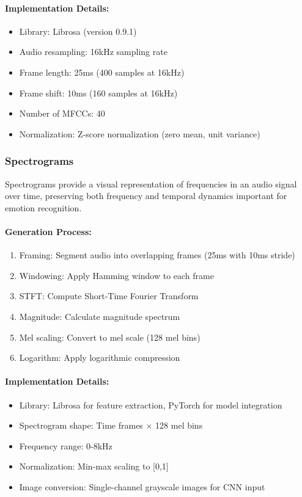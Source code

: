 \documentclass[12pt]{article}
\begin{document}
\paragraph{Implementation Details:}
\begin{itemize}
    \item Library: Librosa (version 0.9.1)
    \item Audio resampling: 16kHz sampling rate
    \item Frame length: 25ms (400 samples at 16kHz)
    \item Frame shift: 10ms (160 samples at 16kHz)
    \item Number of MFCCs: 40
    \item Normalization: Z-score normalization (zero mean, unit variance)
\end{itemize}

\subsubsection{Spectrograms}
Spectrograms provide a visual representation of frequencies in an audio signal over time, preserving both frequency and temporal dynamics important for emotion recognition.

\paragraph{Generation Process:}
\begin{enumerate}
    \item Framing: Segment audio into overlapping frames (25ms with 10ms stride)
    \item Windowing: Apply Hamming window to each frame
    \item STFT: Compute Short-Time Fourier Transform
    \item Magnitude: Calculate magnitude spectrum
    \item Mel scaling: Convert to mel scale (128 mel bins)
    \item Logarithm: Apply logarithmic compression
\end{enumerate}

\paragraph{Implementation Details:}
\begin{itemize}
    \item Library: Librosa for feature extraction, PyTorch for model integration
    \item Spectrogram shape: Time frames × 128 mel bins
    \item Frequency range: 0-8kHz
    \item Normalization: Min-max scaling to [0,1]
    \item Image conversion: Single-channel grayscale images for CNN input
\end{itemize}
\end{document}
